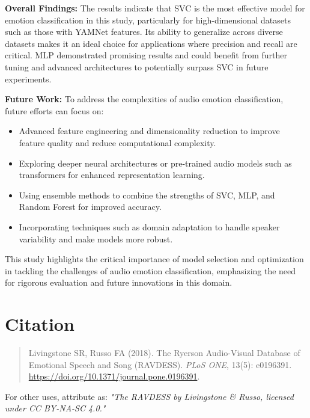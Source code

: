 \documentclass{article}
\begin{document}
\textbf{Overall Findings:}
The results indicate that SVC is the most effective model for emotion classification in this study, particularly for 
high-dimensional datasets such as those with YAMNet features. Its ability to generalize across diverse datasets makes 
it an ideal choice for applications where precision and recall are critical. MLP demonstrated promising results and 
could benefit from further tuning and advanced architectures to potentially surpass SVC in future experiments.

\textbf{Future Work:}
To address the complexities of audio emotion classification, future efforts can focus on:
\begin{itemize}
    \item Advanced feature engineering and dimensionality reduction to improve feature quality and reduce computational complexity.
    \item Exploring deeper neural architectures or pre-trained audio models such as transformers for enhanced representation learning.
    \item Using ensemble methods to combine the strengths of SVC, MLP, and Random Forest for improved accuracy.
    \item Incorporating techniques such as domain adaptation to handle speaker variability and make models more robust.
\end{itemize}

This study highlights the critical importance of model selection and optimization in tackling the challenges of audio emotion 
classification, emphasizing the need for rigorous evaluation and future innovations in this domain.

\section*{Citation}

\begin{quote}
Livingstone SR, Russo FA (2018). The Ryerson Audio-Visual Database of Emotional Speech and Song (RAVDESS). 
\textit{PLoS ONE}, 13(5): e0196391. \url{https://doi.org/10.1371/journal.pone.0196391}.
\end{quote}

For other uses, attribute as:  
\textit{"The RAVDESS by Livingstone \& Russo, licensed under CC BY-NA-SC 4.0."}
\end{document}
